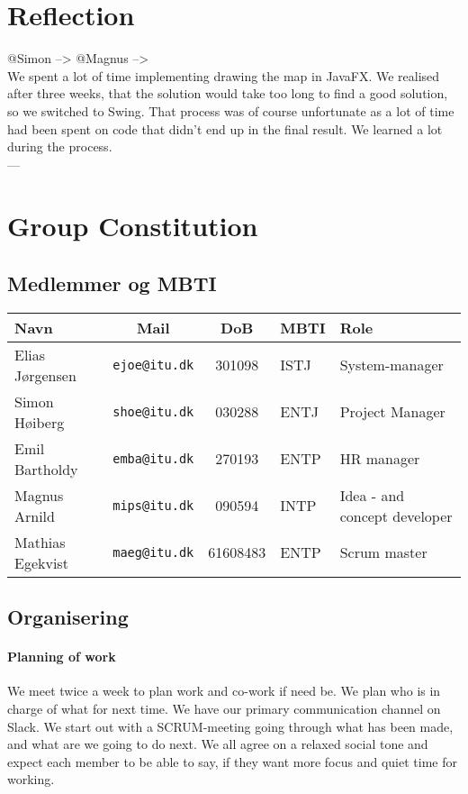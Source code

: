 \documentclass[11pt]{article}
\begin{document}
\section{Reflection}\label{sec:reflection}
@Simon --> @Magnus --> \\
We spent a lot of time implementing drawing the map in JavaFX. We realised after three weeks, that the solution would take too long to find a good solution, so we switched to Swing. That process was of course unfortunate as a lot of time had been spent on code that didn't end up in the final result. We learned a lot during the process.\\
---

\appendix

\section{Group Constitution}

\subsection{Medlemmer og MBTI}

\begin{table}[h!]
    \centering
    \begin{tabular}{l c c l l}
        \textbf{Navn} & \textbf{Mail} & \textbf{DoB} & \textbf{MBTI} & \textbf{Role} \\ \hline
        Elias Jørgensen & \texttt{ejoe@itu.dk} & 301098 & ISTJ & System-manager\\
        Simon Høiberg & \texttt{shoe@itu.dk} & 030288 & ENTJ & Project Manager \\
        Emil Bartholdy & \texttt{emba@itu.dk} & 270193 & ENTP & HR manager\\
        Magnus Arnild & \texttt{mips@itu.dk} & 090594 & INTP & Idea - and concept developer\\
        Mathias Egekvist & \texttt{maeg@itu.dk} & 61608483 & ENTP & Scrum master \\
    \end{tabular}
\end{table}

\subsection{Organisering}

\paragraph{Planning of work}
We meet twice a week to plan work and co-work if need be. We plan who is in charge of what for next time. We have our primary communication channel on Slack.
We start out with a SCRUM-meeting going through what has been made, and what are we going to do next.
We all agree on a relaxed social tone and expect each member to be able to say, if they want more focus and quiet time for working.
\end{document}
